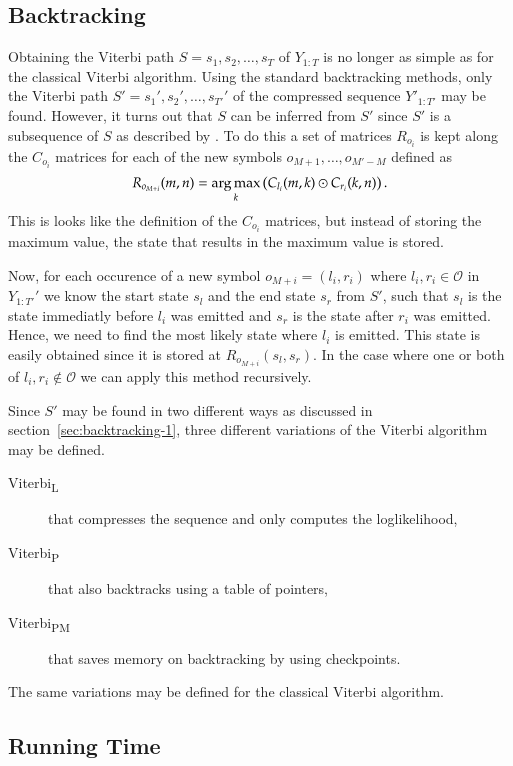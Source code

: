 \subsection{Backtracking}
\label{sec:backtracking}

Obtaining the Viterbi path $S = s_1, s_2, \dots, s_T$ of $Y_{1:T}$ is no longer
as simple as for the classical Viterbi algorithm. Using the standard
backtracking methods, only the Viterbi path $S' = s_1', s_2', \dots, s_{T'}'$
of the compressed sequence $Y'_{1:T'}$ may be found. However, it turns out that
$S$ can be inferred from $S'$ since $S'$ is a subsequence of $S$ as described
by \citet{lifshits2009speeding}. To do this a set of matrices $R_{o_i}$ is kept
along the $C_{o_i}$ matrices for each of the new symbols
$o_{M + 1}, \dots, o_{M' - M}$ defined as
\begin{equation*}
  R_{o_{M + i}}(m, n) = \operatorname*{arg\,max}_k
  \left(
    C_{l_i}(m, k) \odot C_{r_i}(k, n)
  \right).
\end{equation*}
This is looks like the definition of the $C_{o_i}$ matrices, but instead of
storing the maximum value, the state that results in the maximum value is
stored.

Now, for each occurence of a new symbol $o_{M + i} = (l_i, r_i)$ where
$l_i, r_i \in \mathcal{O}$ in $Y_{1:T'}'$ we know the start state $s_l$ and the
end state $s_r$ from $S'$, such that $s_l$ is the state immediatly before $l_i$
was emitted and $s_r$ is the state after $r_i$ was emitted. Hence, we need to
find the most likely state where $l_i$ is emitted. This state is easily
obtained since it is stored at $R_{o_{M + i}}(s_l, s_r)$. In the case where one
or both of $l_i, r_i \not \in \mathcal{O}$ we can apply this method
recursively.

Since $S'$ may be found in two different ways as discussed in
section~\ref{sec:backtracking-1}, three different variations of the Viterbi
algorithm may be defined.
\begin{description}
\item[Viterbi\textsubscript{L}] that compresses the sequence and only computes the
  loglikelihood,
\item[Viterbi\textsubscript{P}] that also backtracks using a table of pointers,
\item[Viterbi\textsubscript{PM}] that saves memory on backtracking by using checkpoints.
\end{description}
The same variations may be defined for the classical Viterbi algorithm.

\subsection{Running Time}
\label{sec:running-time}

